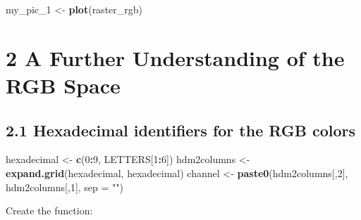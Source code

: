 \documentclass[]{article}
\newenvironment{Shaded}{\begin{snugshade}}{\end{snugshade}}
\newcommand{\DataTypeTok}[1]{\textcolor[rgb]{0.13,0.29,0.53}{#1}}
\newcommand{\DecValTok}[1]{\textcolor[rgb]{0.00,0.00,0.81}{#1}}
\newcommand{\KeywordTok}[1]{\textcolor[rgb]{0.13,0.29,0.53}{\textbf{#1}}}
\newcommand{\NormalTok}[1]{#1}
\newcommand{\OperatorTok}[1]{\textcolor[rgb]{0.81,0.36,0.00}{\textbf{#1}}}
\newcommand{\StringTok}[1]{\textcolor[rgb]{0.31,0.60,0.02}{#1}}
\begin{document}
\begin{Shaded}
\begin{Highlighting}[]
\NormalTok{my_pic_}\DecValTok{1}\NormalTok{ <-}\StringTok{ }\KeywordTok{plot}\NormalTok{(raster_rgb)}
\end{Highlighting}
\end{Shaded}

\clearpage

\hypertarget{a-further-understanding-of-the-rgb-space}{%
\section{2 A Further Understanding of the RGB
Space}\label{a-further-understanding-of-the-rgb-space}}

\hypertarget{hexadecimal-identifiers-for-the-rgb-colors}{%
\subsection{2.1 Hexadecimal identifiers for the RGB
colors}\label{hexadecimal-identifiers-for-the-rgb-colors}}

\begin{Shaded}
\begin{Highlighting}[]
\NormalTok{hexadecimal <-}\StringTok{ }\KeywordTok{c}\NormalTok{(}\DecValTok{0}\OperatorTok{:}\DecValTok{9}\NormalTok{, LETTERS[}\DecValTok{1}\OperatorTok{:}\DecValTok{6}\NormalTok{])}
\NormalTok{hdm2columns <-}\StringTok{ }\KeywordTok{expand.grid}\NormalTok{(hexadecimal, hexadecimal)}
\NormalTok{channel <-}\StringTok{ }\KeywordTok{paste0}\NormalTok{(hdm2columns[,}\DecValTok{2}\NormalTok{], hdm2columns[,}\DecValTok{1}\NormalTok{], }\DataTypeTok{sep =} \StringTok{""}\NormalTok{)}
\end{Highlighting}
\end{Shaded}

Create the function:
\end{document}
